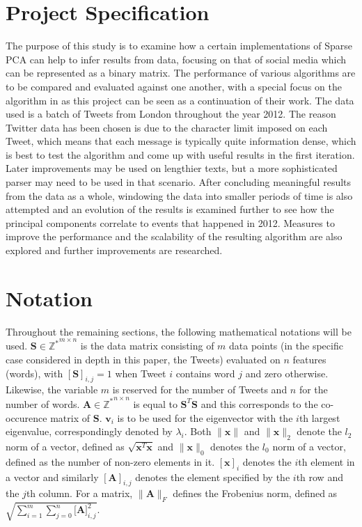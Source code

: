 \documentclass[11pt,a4paper]{article}
\begin{document}

\section{Project Specification}

The purpose of this study is to examine how a certain implementations of Sparse PCA can help to infer results from data, focusing on that of social media which can be represented as a binary matrix. The performance of various algorithms are to be compared and evaluated against one another, with a special focus on the algorithm in \cite{dimakis} as this project can be seen as a continuation of their work. The data used is a batch of Tweets from London throughout the year 2012. The reason Twitter data has been chosen is due to the character limit imposed on each Tweet, which means that each message is typically quite information dense, which is best to test the algorithm and come up with useful results in the first iteration. Later improvements may be used on lengthier texts, but a more sophisticated parser may need to be used in that scenario. After concluding meaningful results from the data as a whole, windowing the data into smaller periods of time is also attempted and an evolution of the results is examined further to see how the principal components correlate to events that happened in 2012. Measures to improve the performance and the scalability of the resulting algorithm are also explored and further improvements are researched.

\section{Notation}

Throughout the remaining sections, the following mathematical notations will be used. $\mathbf{S} \in \mathbb{Z^*}^{m\times n}$ is the data matrix consisting of $m$ data points (in the specific case considered in depth in this paper, the Tweets) evaluated on $n$ features (words), with $[\mathbf{S}]_{i,j} = 1$ when Tweet $i$ contains word $j$ and zero otherwise. Likewise, the variable $m$ is reserved for the number of Tweets and $n$ for the number of words. $\mathbf{A} \in \mathbb{Z^*}^{n \times n}$ is equal to $\mathbf{S}^T\mathbf{S}$ and this corresponds to the co-occurence matrix of $\mathbf{S}$. $\mathbf{v}_i$ is to be used for the eigenvector with the $i$th largest eigenvalue, correspondingly denoted by $\lambda_i$. Both $\|\mathbf{x}\|$ and $\|\mathbf{x}\|_2$ denote the $l_2$ norm of a vector, defined as $\sqrt{\mathbf{x}^T\mathbf{x}}$ and $\|\mathbf{x}\|_0$ denotes the $l_0$ norm of a vector, defined as the number of non-zero elements in it. $[\mathbf{x} ]_i$ denotes the $i$th element in a vector and similarly $[\mathbf{A}]_{i, j}$ denotes the element specified by the $i$th row and the $j$th column. For a matrix, $\|\mathbf{A}\|_F$ defines the Frobenius norm, defined as $\sqrt{\sum^m_{i=1}{\sum_{j=0}^n{\mathbf{[A}]_{i, j}^2}}}$.
\end{document}
